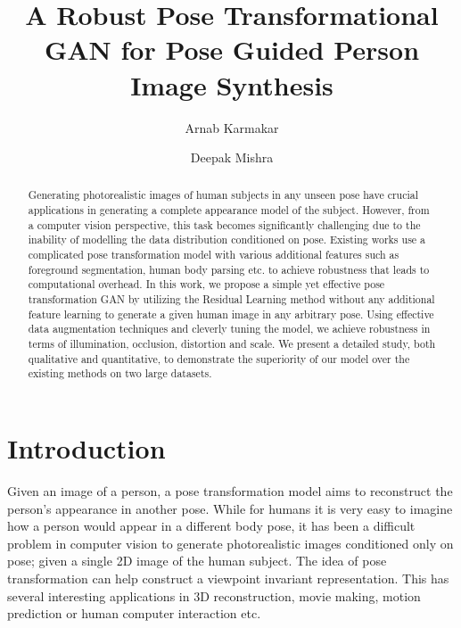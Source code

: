 \documentclass[runningheads]{llncs}
\begin{document}
%
\title{A Robust Pose Transformational GAN for Pose Guided Person Image Synthesis}
%
%
\author{Arnab Karmakar \and
Deepak Mishra}
%
%
%
\maketitle              %
%
\begin{abstract}
Generating photorealistic images of human subjects in any unseen pose have crucial applications in generating a complete appearance model of the subject. However, from a computer vision perspective, this task becomes significantly challenging due to the inability of modelling the data distribution conditioned on pose. Existing works use a complicated pose transformation model with various additional features such as foreground segmentation, human body parsing etc. to achieve robustness that leads to computational overhead. In this work, we propose a simple yet effective pose transformation GAN by utilizing the Residual Learning method without any additional feature learning to generate a given human image in any arbitrary pose. Using effective data augmentation techniques and cleverly tuning the model, we achieve robustness in terms of illumination, occlusion, distortion and scale. We present a detailed study, both qualitative and quantitative, to demonstrate the superiority of our model over the existing methods on two large datasets.
%
\end{abstract}
%
%
%
\section{Introduction}
%
Given an image of a person, a pose transformation model aims to reconstruct the person's appearance in another pose. While for humans it is very easy to imagine how a person would appear in a different body pose, it has been a difficult problem in computer vision to generate photorealistic images conditioned only on pose; given a single 2D image of the human subject. The idea of pose transformation can help construct a viewpoint invariant representation. This has several interesting applications in 3D reconstruction, movie making, motion prediction or human computer interaction etc.
\end{document}
